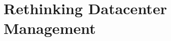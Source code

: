 \documentclass[../HFT-main.tex]{subfiles}
\begin{document}
\clearpage
\section{\huge Rethinking Datacenter Management}
%
%

%
% 
 
%
%
%
\end{document}

